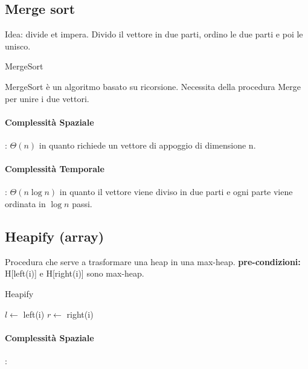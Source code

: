 \documentclass{article}
\DeclarePairedDelimiter\floor{\lfloor}{\rfloor}
\begin{document}
\subsection{Merge sort} %
Idea: divide et impera. Divido il vettore in due parti, ordino le due parti e poi le unisco.

\begin{algorithm}[H]
\caption{MergeSort}
\end{algorithm}

MergeSort è un algoritmo basato su ricorsione. Necessita della procedura Merge per unire i due vettori.

\paragraph{Complessità Spaziale}: $\Theta(n)$ in quanto richiede un vettore di appoggio di dimensione n.

\paragraph{Complessità Temporale}: $\Theta(n \log n)$ in quanto il vettore viene diviso in due parti e
ogni parte viene ordinata in $\log n$ passi.

\subsection{Heapify (array)} %
Procedura che serve a trasformare una heap in una max-heap. \newline
\textbf{pre-condizioni:} H[left(i)] e H[right(i)] sono max-heap.


\begin{algorithm}[H]
\caption{Heapify}
$l \leftarrow$ left(i)\;
$r \leftarrow$ right(i)\;
\end{algorithm}

\paragraph{Complessità Spaziale}: 
\end{document}
